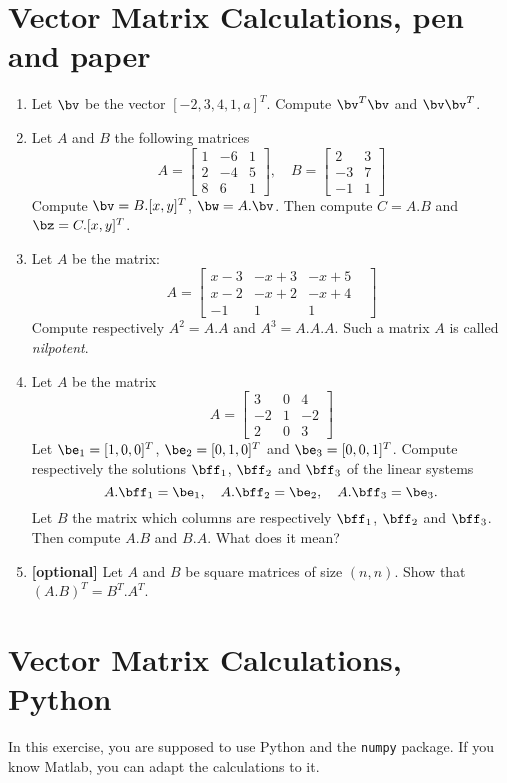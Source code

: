 \documentclass[a4paper,10pt]{article}
\begin{document}
\section{Vector Matrix Calculations, pen and paper}
\begin{enumerate}
  \item Let $\bv$ be the vector $[-2,3,4,1,a]^T$. Compute $\bv^T\bv$ and $\bv\bv^T$.
  \item Let $A$ and $B$ the following matrices
  $$
  A = \begin{bmatrix}
    1 & -6 & 1\\
    2 & -4 & 5\\
    8 & 6 & 1
  \end{bmatrix},
  \quad
  B = \begin{bmatrix}
    2 & 3\\ -3 & 7\\ -1 &1
  \end{bmatrix}
  $$
  Compute $\bv = B.[x,y]^T$, $\bw = A.\bv$. Then compute $C = A.B$ and $\bz = C.[x,y]^T$.
  \item Let $A$ be the matrix:
  $$
  A = \begin{bmatrix}
  x-3&  -x+3&  -x+5\\
  x-2&  -x+2&  -x+4&\\
   -1&   1&   1&
   \end{bmatrix}
  $$
  Compute respectively $A^2 = A.A$ and $A^3 = A.A.A$. Such a matrix $A$ is called \emph{nilpotent}.
  \item Let $A$ be the matrix
  $$
  A = \begin{bmatrix}
    3 & 0 & 4\\
    -2 & 1 & -2\\
    2 & 0 & 3 
  \end{bmatrix}
  $$
  Let $\be_1 = [1,0,0]^T$, $\be_2 = [0,1,0]^T$ and $\be_3=[0,0,1]^T$.
  Compute respectively the solutions $\bff_1$, $\bff_2$ and $\bff_3$ of the linear systems 
  $$
  A.\bff_1 = \be_1,\quad A.\bff_2 = \be_2,\quad A.\bff_3 = \be_3.
  $$
  Let $B$ the matrix which columns are respectively $\bff_1$, $\bff_2$ and $\bff_3$. Then compute $A.B$ and $B.A$. What does it mean?
  \item {\bf[optional]} Let $A$ and $B$ be square matrices of size $(n,n)$. Show that $(A.B)^T = B^T.A^T$.
\end{enumerate}


\section{Vector Matrix Calculations, Python}
In this exercise, you are supposed to use Python and the \texttt{numpy} package. If you know Matlab, you can adapt the calculations to it.
\end{document}
